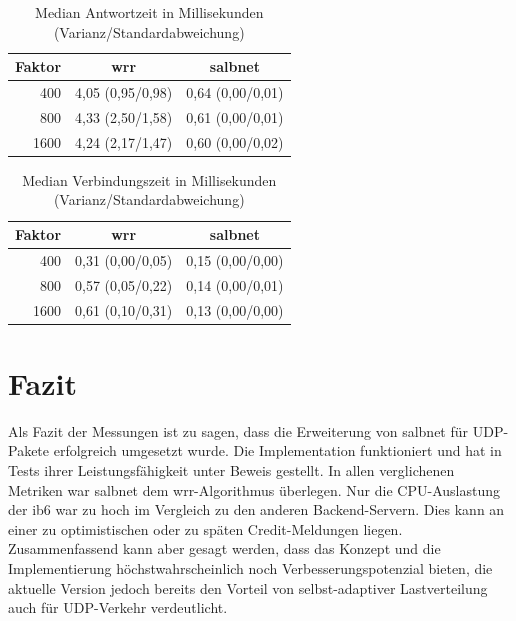 \documentclass[a4paper, 12pt, BCOR10mm, DIV12, toc=bibliography, toc=listof, german]{scrbook}
\begin{document}
			\begin{table}
				\centering
				\begin{tabular}{|r|c|c|}\hline
					Faktor & wrr & salbnet \\\hline\hline
					400 & 4,05 (0,95/0,98) & 0,64 (0,00/0,01)\\
					800 & 4,33 (2,50/1,58) & 0,61 (0,00/0,01)\\
					1600 & 4,24 (2,17/1,47) & 0,60 (0,00/0,02)\\\hline
				\end{tabular}
				\caption{Median Antwortzeit in Millisekunden (Varianz/Standardabweichung)}
				\label{tab:response}
			\end{table}

			\begin{table}
				\centering
				\begin{tabular}{|r|c|c|}\hline
					Faktor & wrr & salbnet \\\hline\hline
					400 & 0,31 (0,00/0,05) & 0,15 (0,00/0,00)\\
					800 & 0,57 (0,05/0,22) & 0,14 (0,00/0,01)\\
					1600 & 0,61 (0,10/0,31) & 0,13 (0,00/0,00)\\\hline
				\end{tabular}
				\caption{Median Verbindungszeit in Millisekunden (Varianz/Standardabweichung)}
				\label{tab:connect}
			\end{table}


		\section{Fazit} %
		\label{sec:Fazit}

		Als Fazit der Messungen ist zu sagen, dass die Erweiterung von salbnet für UDP-Pakete
		erfolgreich umgesetzt wurde. Die Implementation funktioniert und hat in Tests ihrer
		Leistungsfähigkeit unter Beweis gestellt. In allen verglichenen Metriken war salbnet dem
		wrr-Algorithmus überlegen. Nur die CPU-Auslastung der ib6 war zu hoch im Vergleich zu den
		anderen Backend-Servern. Dies kann an einer zu optimistischen oder zu späten Credit-Meldungen
		liegen. Zusammenfassend kann aber gesagt werden, dass das Konzept und die Implementierung
		höchstwahrscheinlich noch Verbesserungspotenzial bieten, die aktuelle Version jedoch bereits den
		Vorteil von selbst-adaptiver Lastverteilung auch für UDP-Verkehr verdeutlicht.
\end{document}
